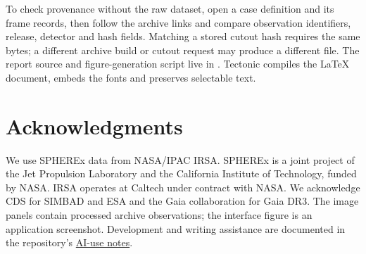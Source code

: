 \documentclass[11pt,letterpaper]{article}
\begin{document}
To check provenance without the raw dataset, open a case definition and its frame records, then follow the archive links and compare observation identifiers, release, detector and hash fields. Matching a stored cutout hash requires the same bytes; a different archive build or cutout request may produce a different file. The report source and figure-generation script live in . Tectonic compiles the LaTeX document, embeds the fonts and preserves selectable text.

\section*{Acknowledgments}
We use SPHEREx data from NASA/IPAC IRSA. SPHEREx is a joint project of the Jet Propulsion Laboratory and the California Institute of Technology, funded by NASA. IRSA operates at Caltech under contract with NASA. We acknowledge CDS for SIMBAD and ESA and the Gaia collaboration for Gaia DR3. The image panels contain processed archive observations; the interface figure is an application screenshot. Development and writing assistance are documented in the repository's \href{https://github.com/sathvikloke/perigee/blob/main/docs/AI_USE.md}{AI-use notes}.
\end{document}
